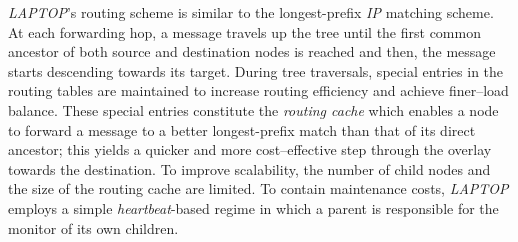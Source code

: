 \emph{LAPTOP}'s routing scheme is similar to the 
longest-prefix \emph{IP} matching scheme. 
At each forwarding hop, a message travels up the tree 
until the first common ancestor of both source and destination nodes 
is reached and then, the message starts descending towards its target. 
During tree traversals, special entries in the routing tables
are maintained to increase routing efficiency and achieve finer--load balance.
These special entries constitute the \emph{routing cache} which enables a node
to forward a message to a better 
longest-prefix match than that of its direct ancestor;
this yields a quicker and more cost--effective step through the overlay towards
the destination. 
To improve scalability, the number of child nodes and the
size of the routing cache are limited. 
To contain maintenance costs, \emph{LAPTOP} employs 
a simple \emph{heartbeat}-based regime in which 
a parent is responsible for the monitor of its own children.
%
%
%
